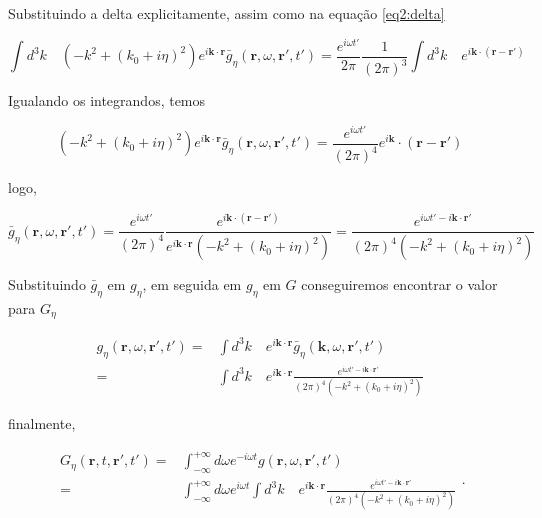Substituindo a delta explicitamente, assim como na equação \ref{eq2:delta}

\begin{equation}
	\int d^3 k \quad \left( -k^2 + (k_0+i\eta)^2\right) e^{i\textbf{k}\cdot\textbf{r}}\bar{g}_{\eta}(\textbf{r},\omega, \textbf{r}', t') 
	= \frac{e^{i\omega t'}}{2\pi}\frac{1}{(2\pi)^3} \int d^3k \quad e^{i\textbf{k}\cdot(\textbf{r}-\textbf{r}')}
\end{equation}

Igualando os integrandos, temos

\begin{equation}
	\left( -k^2 + (k_0+i\eta)^2\right) e^{i\textbf{k}\cdot\textbf{r}} \bar{g}_{\eta}(\textbf{r},\omega, \textbf{r}', t') = \frac{e^{i\omega t'}}{(2\pi)^4}e^{i\textbf{k}}\cdot(\textbf{r}-\textbf{r}')
\end{equation}

logo,

\begin{equation}
	 \bar{g}_{\eta}(\textbf{r},\omega, \textbf{r}', t') = \frac{e^{i\omega t'}}{(2\pi)^4}\frac{e^{i\textbf{k}\cdot(\textbf{r}-\textbf{r}')}}{e^{i\textbf{k}\cdot\textbf{r}} \left( -k^2 + (k_0+i\eta)^2\right)} = \frac{e^{i\omega t'-i\textbf{k}\cdot\textbf{r}'}}{(2\pi)^4\left( -k^2 + (k_0+i\eta)^2\right)}
\end{equation}

Substituindo $\bar{g}_\eta$ em $g_{\eta}$, em seguida em $g_{\eta}$ em $G$ conseguiremos encontrar o valor para $G_{\eta}$

\begin{equation}
	\begin{split}
	g_{\eta}(\textbf{r}, \omega, \textbf{r}', t') = &
	\int d^3k \quad e^{i\textbf{k}\cdot\textbf{r}}\bar{g}_{\eta}(\textbf{k}, \omega, \textbf{r}', t') \\
	= & \int d^3k \quad e^{i\textbf{k}\cdot\textbf{r}} \frac{e^{i\omega t'-i\textbf{k}\cdot\textbf{r}'}}{(2\pi)^4\left( -k^2 + (k_0+i\eta)^2\right)}
	\end{split}
\end{equation}

finalmente,

\begin{equation}
	\begin{split}
	G_{\eta}(\textbf{r},t, \textbf{r}', t') = & 
	\int_{-\infty}^{+\infty} d\omega e^{-i\omega t} g(\textbf{r},\omega, \textbf{r}', t') \\
	= & \int_{-\infty}^{+\infty} d\omega e^{i\omega t} \int d^3k \quad e^{i\textbf{k}\cdot\textbf{r}} \frac{e^{i\omega t'-i\textbf{k}\cdot\textbf{r}'}}{(2\pi)^4\left( -k^2 + (k_0+i\eta)^2\right)}
	\end{split}.
\end{equation}

